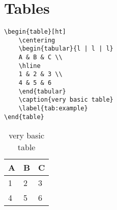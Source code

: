 \section{Tables}\label{sec:Elements_tables}

\begin{lstlisting}
\begin{table}[ht]
	\centering
	\begin{tabular}{l | l | l}
	A & B & C \\
	\hline
	1 & 2 & 3 \\
	4 & 5 & 6
	\end{tabular}
	\caption{very basic table}
	\label{tab:example}
\end{table}
\end{lstlisting}

\begin{table}[ht]
	\centering
	\begin{tabular}{l | l | l}
	A & B & C \\
	\hline
	1 & 2 & 3 \\
	4 & 5 & 6
	\end{tabular}
	\caption{very basic table}
	\label{tab:example}
\end{table}
%
